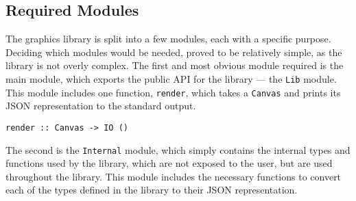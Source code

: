 \documentclass[../main.tex]{subfiles}
\begin{document}
        \subsection{Required Modules}
            The graphics library is split into a few modules, each with a specific purpose.
            Deciding which modules would be needed, proved to be relatively simple, as the
                library is not overly complex.
            The first and most obvious module required is the main module, which exports
                the public API for the library — the \verb|Lib| module.
            This module includes one function, \verb|render|, which takes a \verb|Canvas|
                and prints its JSON representation to the standard output.

            \begin{lstlisting}[label={lst:lib}, caption={The render function.}]
render :: Canvas -> IO ()\end{lstlisting}

            The second is the \verb|Internal| module, which simply contains the internal
                types and functions used by the library, which are not exposed to the user, but
                are used throughout the library.
            This module includes the necessary functions to convert each of the types
                defined in the library to their JSON representation.
\end{document}
